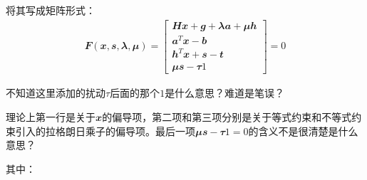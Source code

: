 将其写成矩阵形式：
\begin{align}
  \mathbfit{F}(\mathbfit{x},\mathbfit{s},\mathbfit{\lambda},\mathbfit{\mu})=\begin{bmatrix}
    \mathbfit{H}\mathbfit{x}+\mathbfit{g}+\mathbfit{\lambda}\mathbfit{a}+\mathbfit{\mu}\mathbfit{h}\\
    \mathbfit{a}^T\mathbfit{x}-\mathbfit{b}\\
    \mathbfit{h}^T\mathbfit{x}+\mathbfit{s}-\mathbfit{t}\\
    \mathbfit{\mu}\mathbfit{s}-\mathbfit{\tau}\mathbfit{1}
  \end{bmatrix} = 0
\end{align}
\begin{note}
  不知道这里添加的扰动$\tau$后面的那个$1$是什么意思？难道是笔误？
  
  理论上第一行是关于$\mathbfit{x}$的偏导项，第二项和第三项分别是关于等式约束和不等式约束引入的拉格朗日乘子的偏导项。最后一项$\mathbfit{\mu}\mathbfit{s}-\mathbfit{\tau}\mathbfit{1}=0$的含义不是很清楚是什么意思？
\end{note}
其中：
